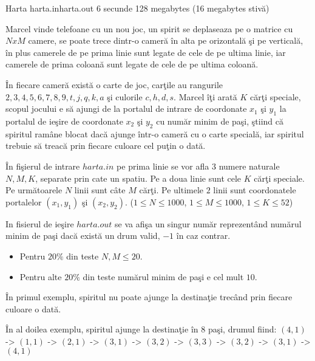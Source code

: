 \begin{problem}{Harta}
{harta.in}{harta.out}
{6 secunde} {128 megabytes (16 megabytes stiv\u{a})}{}

Marcel vinde telefoane cu un nou joc, un spirit se deplaseaza pe o matrice cu $NxM$ camere, se poate trece dintr-o camer\u{a} \^{i}n alta pe orizontal\u{a} \c{s}i pe vertical\u{a}, \^{i}n plus camerele de pe prima linie sunt legate de cele de pe ultima linie, iar camerele de prima coloan\u{a} sunt legate de cele de pe ultima coloan\u{a}.

\^{I}n fiecare camer\u{a} exist\u{a} o carte de joc, car\c{t}ile au rangurile ${2, 3, 4, 5, 6, 7, 8, 9, t, j, q, k, a}$ \c{s}i culorile ${c, h, d, s}$. Marcel \^{i}\c{t}i arat\u{a} $K$ c\u{a}r\c{t}i speciale, scopul jocului e s\u{a} ajungi de la portalul de intrare de coordonate $x_1$ \c{s}i $y_1$ la portalul de ie\c{s}ire de coordonate $x_2$ \c{s}i $y_2$ cu num\u{a}r minim de pa\c{s}i, \c{s}tiind c\u{a} spiritul ram\^{a}ne blocat dac\u{a} ajunge \^{i}ntr-o camer\u{a} cu o carte special\u{a}, iar spiritul trebuie s\u{a} treac\u{a} prin fiecare culoare cel pu\c{t}in o dat\u{a}.

\InputFile
\^{I}n fi\c{s}ierul de intrare $harta.in$ pe prima linie se vor afla $3$ numere naturale $N, M, K$, separate prin cate un spatiu. Pe a doua linie sunt cele $K$ c\u{a}r\c{t}i speciale. Pe urm\u{a}toarele $N$ linii sunt c\^{a}te $M$ c\u{a}r\c{t}i. Pe ultimele $2$ linii sunt coordonatele portalelor $(x_1, y_1)$ \c{s}i $(x_2, y_2)$. ($1 \le N \le 1000$, $1 \le M \le 1000$, $1 \le K \le 52$)

\OutputFile
In fisierul de ie\c{s}ire $harta.out$ se va afi\c{s}a un singur num\u{a}r reprezent\^{a}nd num\u{a}rul minim de pa\c{s}i dac\u{a} exist\u{a} un drum valid, $-1$ \^{i}n caz contrar.

\Notes
\begin{itemize}
	\setlength{\itemsep}{1pt}
  	\setlength{\parskip}{0pt}
  	\setlength{\parsep}{0pt}
	\item Pentru $20 \%$ din teste $N, M \le 20$.
	\item Pentru alte $20 \%$ din teste num\u{a}rul minim de pa\c{s}i e cel mult $10$.
\end{itemize}

\Examples

\begin{example}
%
%
\end{example}

\Explanations

\^{I}n primul exemplu, spiritul nu poate ajunge la destina\c{t}ie trec\^{a}nd prin fiecare culoare o dat\u{a}.

\^{I}n al doilea exemplu, spiritul ajunge la destina\c{t}ie \^{i}n $8$ pa\c{s}i, drumul fiind: $(4,1)$ -> $(1, 1)$ -> $(2, 1)$ -> $(3, 1)$ -> $(3, 2)$ -> $(3, 3)$ -> $(3, 2)$ -> $(3, 1)$ -> $(4, 1)$

\end{problem}
